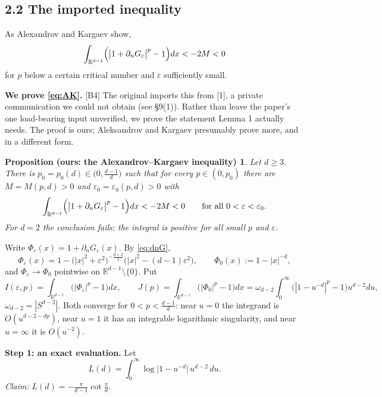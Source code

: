 \documentclass[11pt,reqno]{amsart}
\theoremstyle{plain}
\theoremstyle{definition}
\theoremstyle{plain}
\newtheorem*{propAK}{Proposition (ours: the Alexandrov--Kargaev inequality)}
\theoremstyle{definition}
\theoremstyle{remark}
\newcommand{\Rdm}{\mathbb{R}^{d-1}}
\newcommand{\nd}{\partial_n}
\newcommand{\Ledger}[1]{{\scriptsize\textsf{[#1]}}}
\begin{document}
\subsection*{2.2 The imported inequality}

As Alexandrov and Kargaev show,
\begin{equation}\label{eq:AK}
  \int_{\Rdm}\Bigl(\bigl|1+\nd G_\varepsilon\bigr|^p-1\Bigr)dx<-2M<0
\end{equation}
for $p$ below a certain critical number and $\varepsilon$ sufficiently small.

\begin{filled}
\textbf{We prove \eqref{eq:AK}.} \Ledger{B4} The original imports this from [1], a
private communication we could not obtain (see \S9(1)). Rather than leave the paper's
one load-bearing input unverified, we prove the statement Lemma 1 actually needs.
The proof is ours; Aleksandrov and Kargaev presumably prove more, and in a different
form.

\begin{propAK}
Let $d\ge3$. There is $p_0=p_0(d)\in\bigl(0,\tfrac{d-1}{d}\bigr)$ such that for every
$p\in(0,p_0)$ there are $M=M(p,d)>0$ and $\varepsilon_0=\varepsilon_0(p,d)>0$ with
\[\int_{\Rdm}\Bigl(\bigl|1+\nd G_\varepsilon\bigr|^p-1\Bigr)dx<-2M<0
  \qquad\text{for all }0<\varepsilon<\varepsilon_0 .\]
For $d=2$ the conclusion fails: the integral is positive for all small $p$ and
$\varepsilon$.
\end{propAK}

Write $\Phi_\varepsilon(x)=1+\nd G_\varepsilon(x)$. By \eqref{eq:dnG},
\begin{equation}\label{eq:Phieps}
 \Phi_\varepsilon(x)=1-\bigl(|x|^2+\varepsilon^2\bigr)^{-\frac{d+2}2}
   \bigl(|x|^2-(d-1)\varepsilon^2\bigr),
 \qquad
 \Phi_0(x):=1-|x|^{-d},
\end{equation}
and $\Phi_\varepsilon\to\Phi_0$ pointwise on $\Rdm\setminus\{0\}$. Put
\[I(\varepsilon,p)=\int_{\Rdm}\bigl(|\Phi_\varepsilon|^p-1\bigr)dx,
  \qquad
  J(p)=\int_{\Rdm}\bigl(|\Phi_0|^p-1\bigr)dx
      =\omega_{d-2}\!\int_0^\infty\!\bigl(|1-u^{-d}|^p-1\bigr)u^{d-2}du,\]
$\omega_{d-2}=|S^{d-2}|$. Both converge for $0<p<\frac{d-1}{d}$: near $u=0$ the
integrand is $O(u^{d-2-dp})$, near $u=1$ it has an integrable logarithmic
singularity, and near $u=\infty$ it is $O(u^{-2})$.

\medskip
\noindent\textbf{Step 1: an exact evaluation.} Let
\[L(d)=\int_0^\infty\log\bigl|1-u^{-d}\bigr|\,u^{d-2}\,du .\]
\emph{Claim:} $\displaystyle L(d)=-\frac{\pi}{d-1}\cot\frac{\pi}{d}$.


\end{filled}
\end{document}
